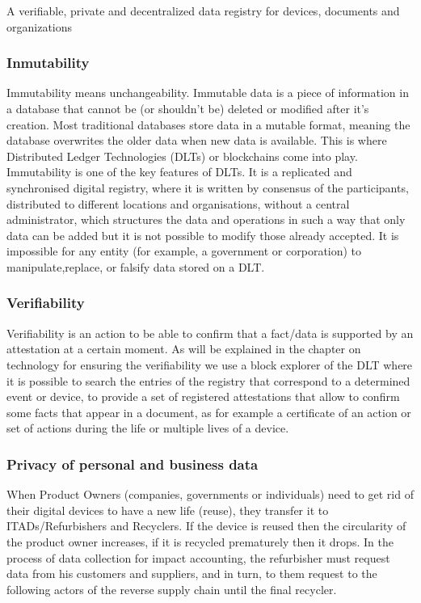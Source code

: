 \documentclass[
]{book}
\begin{document}
A verifiable, private and decentralized data registry for devices, documents and organizations

\hypertarget{inmutability}{%
\subsubsection{Inmutability}\label{inmutability}}

Immutability means unchangeability. Immutable data is a piece of information in a database that cannot be (or shouldn't be) deleted or modified after it's creation. Most traditional databases store data in a mutable format, meaning the database overwrites the older data when new data is available. This is where Distributed Ledger Technologies (DLTs) or blockchains come into play. Immutability is one of the key features of DLTs. It is a replicated and synchronised digital registry, where it is written by consensus of the participants, distributed to different locations and organisations, without a central administrator, which structures the data and operations in such a way that only data can be added but it is not possible to modify those already accepted. It is impossible for any entity (for example, a government or corporation) to manipulate,replace, or falsify data stored on a DLT.

\hypertarget{verifiability}{%
\subsubsection{Verifiability}\label{verifiability}}

Verifiability is an action to be able to confirm that a fact/data is supported by an attestation at a certain moment. As will be explained in the chapter on technology for ensuring the verifiability we use a block explorer of the DLT where it is possible to search the entries of the registry that correspond to a determined event or device, to provide a set of registered attestations that allow to confirm some facts that appear in a document, as for example a certificate of an action or set of actions during the life or multiple lives of a device.

\hypertarget{privacy-of-personal-and-business-data}{%
\subsubsection{Privacy of personal and business data}\label{privacy-of-personal-and-business-data}}

When Product Owners (companies, governments or individuals) need to get rid of their digital devices to have a new life (reuse), they transfer it to ITADs/Refurbishers and Recyclers. If the device is reused then the circularity of the product owner increases, if it is recycled prematurely then it drops. In the process of data collection for impact accounting, the refurbisher must request data from his customers and suppliers, and in turn, to them request to the following actors of the reverse supply chain until the final recycler.
\end{document}
